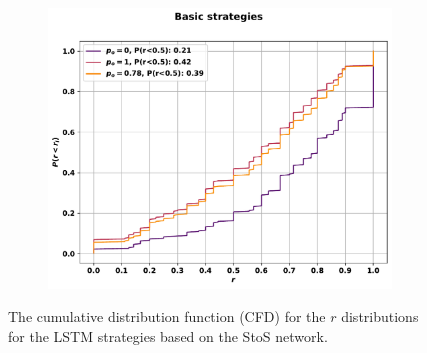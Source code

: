 \begin{figure}[!htbp]
\begin{subfigure}{.5\textwidth}
    \end{subfigure}\hfill
    \begin{subfigure}{.5\textwidth}
    \centering
    \includegraphics[width=.75\textwidth]{src/chapters/07/img/cfd_to_sequence_basic_strategies.pdf}
    \end{subfigure}
    \caption{The cumulative distribution function (CFD)
    for the \(r\) distributions for the LSTM strategies based on the StoS
    network.}\label{fig:cfd_s_to_s}
\end{figure}

